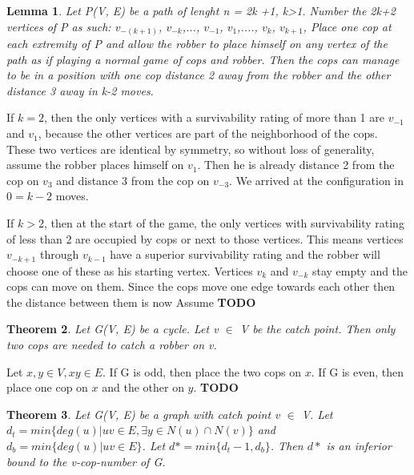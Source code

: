 \documentclass{article}
\newtheorem{theorem}{Theorem}[section]
\newtheorem{lemma}[theorem]{Lemma}
\newenvironment{proof}[1][Proof]{\begin{trivlist}
\item[\hskip \labelsep {\bfseries #1}]}{\end{trivlist}}
\begin{document}
\begin{lemma}
\label{ shorting the gap }
Let P(V, E) be a path of lenght n = 2k +1, k>1. Number the 2k+2 vertices of P as such: $v_{-(k+1)}$, $v_{-k}$,..., $v_{-1}$, $v_{1}$,...., $v_{k}$, $v_{k+1}$, Place one cop at each extremity of P and allow the robber to place himself on any vertex of the path as if playing a normal game of cops and robber. Then the cops can manage to be in a position with one cop distance 2 away from the robber and the other distance 3 away in k-2 moves. 
\end{lemma}
\begin{proof}
If $k = 2$, then the only vertices with a survivability rating of more than 1 are $v_{-1}$ and $v_1$, because the other vertices are part of the neighborhood of the cops. These two vertices are identical by symmetry, so without loss of generality, assume the robber places himself on $v_1$. Then he is already distance 2 from the cop on $v_3$ and distance 3 from the cop on $v_{-3}$. We arrived at the configuration in $0 = k-2$ moves.

If $k > 2$, then at the start of the game, the only vertices with survivability rating of less than 2 are occupied by cops or next to those vertices. This means vertices $v_{-k+1}$ through $v_{k-1}$ have a superior survivability rating and the robber will choose one of these as his starting vertex. Vertices $v_{k}$ and $v_{-k}$ stay empty and the cops can move on them. Since the cops move one edge towards each other then the distance between them is now 
Assume \textbf{TODO}

\end{proof}
\begin{theorem}
\label{cycle}
Let G(V, E) be a cycle. Let v $\in$ V be the catch point. Then only two cops are needed to catch a robber on v.
\end{theorem}
\begin{proof}
Let $x, y \in V, xy \in E$.
If G is odd, then place the two cops on $x$. If G is even, then place one cop on $x$ and the other on $y$. \textbf{TODO}

\end{proof}
\begin{theorem}
\label{catch_number}
Let G(V, E) be a graph with catch point v $\in$ V. Let $d_t = min\{deg(u) | uv \in E, \exists y \in N(u) \cap N(v) \}$ and $d_b = min\{deg(u) | uv \in E\}$. Let $d* = min\{d_t-1, d_b\}$. Then $d*$ is an inferior bound to the v-cop-number of G.
\end{theorem}
\end{document}

